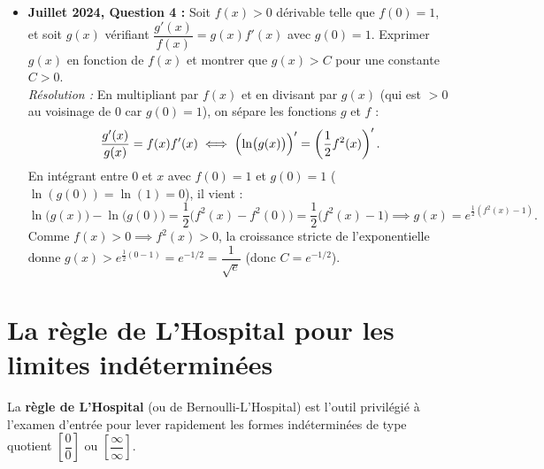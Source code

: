 \begin{exemple}
\begin{itemize}
\begin{enumerate}[label=\alph*)]
\[        \]
        Dès lors, $g'(x) = 1 \implies g(x) = \arcsin\left(\frac{f(x)}{k}\right) = x + C \implies \boxed{f(x) = k\sin(x + C)}$.
    \end{enumerate}
    \item \textbf{Juillet 2024, Question 4 :} Soit $f(x) > 0$ dérivable telle que $f(0) = 1$, et soit $g(x)$ vérifiant $\dfrac{g'(x)}{f(x)} = g(x)f'(x)$ avec $g(0) = 1$. Exprimer $g(x)$ en fonction de $f(x)$ et montrer que $g(x) > C$ pour une constante $C > 0$.\\
    \emph{Résolution :} En multipliant par $f(x)$ et en divisant par $g(x)$ (qui est $>0$ au voisinage de $0$ car $g(0) = 1$), on sépare les fonctions $g$ et $f$ :
    \[
        \frac{g'(x)}{g(x)} = f(x)f'(x) \iff \Bigl(\ln\bigl(g(x)\bigr)\Bigr)' = \left(\frac{1}{2}f^2(x)\right)'.
    \]
    En intégrant entre $0$ et $x$ avec $f(0) = 1$ et $g(0) = 1$ ($\ln(g(0)) = \ln(1) = 0$), il vient :
    \[
        \ln\bigl(g(x)\bigr) - \ln\bigl(g(0)\bigr) = \frac{1}{2}\bigl(f^2(x) - f^2(0)\bigr) = \frac{1}{2}\bigl(f^2(x) - 1\bigr) \implies \boxed{g(x) = e^{\frac{1}{2}(f^2(x) - 1)}}.
    \]
    Comme $f(x) > 0 \implies f^2(x) > 0$, la croissance stricte de l'exponentielle donne $g(x) > e^{\frac{1}{2}(0-1)} = \boxed{e^{-1/2} = \dfrac{1}{\sqrt{e}}}$ (donc $C = e^{-1/2}$).
\end{itemize}
\end{exemple}

\section{La règle de L'Hospital pour les limites indéterminées}

La \textbf{règle de L'Hospital} (ou de Bernoulli-L'Hospital) est l'outil privilégié à l'examen d'entrée pour lever rapidement les formes indéterminées de type quotient $\left[\dfrac{0}{0}\right]$ ou $\left[\dfrac{\infty}{\infty}\right]$.

